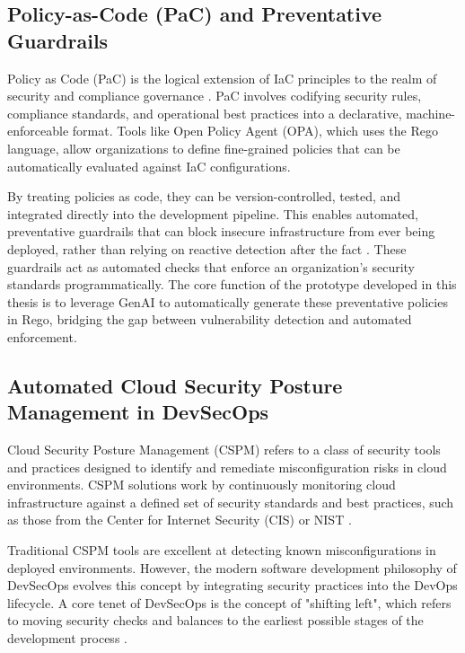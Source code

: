 \subsection{Policy-as-Code (PaC) and Preventative Guardrails}
Policy as Code (PaC) is the logical extension of IaC principles to the realm of security and compliance governance \cite{sarathe_krisshnan_jutoo_vijayaraghavan_policy_2025}. PaC involves codifying security rules, compliance standards, and operational best practices into a declarative, machine-enforceable format. Tools like Open Policy Agent (OPA), which uses the Rego language, allow organizations to define fine-grained policies that can be automatically evaluated against IaC configurations.

By treating policies as code, they can be version-controlled, tested, and integrated directly into the development pipeline. This enables automated, preventative guardrails that can block insecure infrastructure from ever being deployed, rather than relying on reactive detection after the fact \cite{amazon_web_services_aws_2024}. These guardrails act as automated checks that enforce an organization's security standards programmatically. The core function of the prototype developed in this thesis is to leverage GenAI to automatically generate these preventative policies in Rego, bridging the gap between vulnerability detection and automated enforcement.

\subsection{Automated Cloud Security Posture Management in DevSecOps}
Cloud Security Posture Management (CSPM) refers to a class of security tools and practices designed to identify and remediate misconfiguration risks in cloud environments. CSPM solutions work by continuously monitoring cloud infrastructure against a defined set of security standards and best practices, such as those from the Center for Internet Security (CIS) or NIST \cite{tunc_cloud_2017}.

Traditional CSPM tools are excellent at detecting known misconfigurations in deployed environments. However, the modern software development philosophy of DevSecOps evolves this concept by integrating security practices into the DevOps lifecycle. A core tenet of DevSecOps is the concept of "shifting left", which refers to moving security checks and balances to the earliest possible stages of the development process \cite{akto_shift_2025}.

